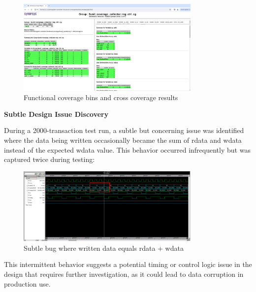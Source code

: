 \documentclass[11pt]{article}
\begin{document}
\begin{figure}[h]
\centering
\includegraphics[width=0.8\textwidth]{browser_cov_report_group_functional_bins.png}
\caption{Functional coverage bins and cross coverage results}
\end{figure}

\textbf{Subtle Design Issue Discovery}

During a 2000-transaction test run, a subtle but concerning issue was identified where the data being written occasionally became the sum of rdata and wdata instead of the expected wdata value. This behavior occurred infrequently but was captured twice during testing:

\begin{figure}[h]
\centering
\includegraphics[width=0.8\textwidth]{weird_sum_bug_not_sure.png}
\caption{Subtle bug where written data equals rdata + wdata}
\end{figure}

This intermittent behavior suggests a potential timing or control logic issue in the design that requires further investigation, as it could lead to data corruption in production use.
\end{document}
